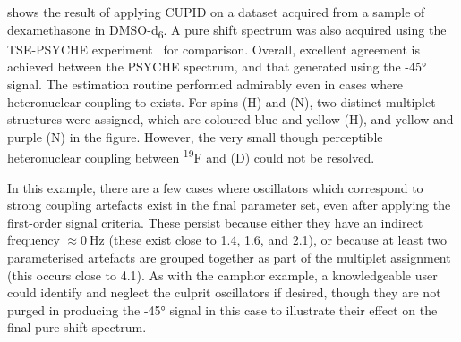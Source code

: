  shows the result of applying CUPID on a
dataset acquired from a sample of dexamethasone in
DMSO-d\textsubscript{6}. A
pure shift spectrum was also acquired using the
\ac{TSE-PSYCHE} experiment~\cite{Foroozandeh2018,Foroozandeh2015} for
comparison.
Overall, excellent agreement is achieved between the \ac{PSYCHE}
spectrum, and that generated using the \ang{-45} signal. The estimation routine
performed admirably even in cases where heteronuclear coupling to
 exists. For spins (H) and (N), two distinct
multiplet structures were assigned, which are coloured blue and yellow (H), and
yellow and purple (N) in the figure. However, the very small though perceptible
heteronuclear coupling between \textsuperscript{19}F and (D) could not be
resolved.

In this example, there are a few cases where oscillators which correspond to
strong coupling artefacts exist in the final parameter set, even after applying
the first-order signal criteria. These persist because either they have an
indirect frequency
$\approx \qty{0}{\hertz}$ (these exist close to
\qty{1.4}{\partspermillion}, \qty{1.6}{\partspermillion}, and
\qty{2.1}{\partspermillion}), or because at
least two parameterised artefacts are grouped together as part of the multiplet
assignment (this occurs close to \qty{4.1}{\partspermillion}). As with the
camphor example, a knowledgeable user could identify and neglect the culprit
oscillators if desired, though they are not purged in producing the \ang{-45}
signal in this case to illustrate their effect on the final pure shift spectrum.

